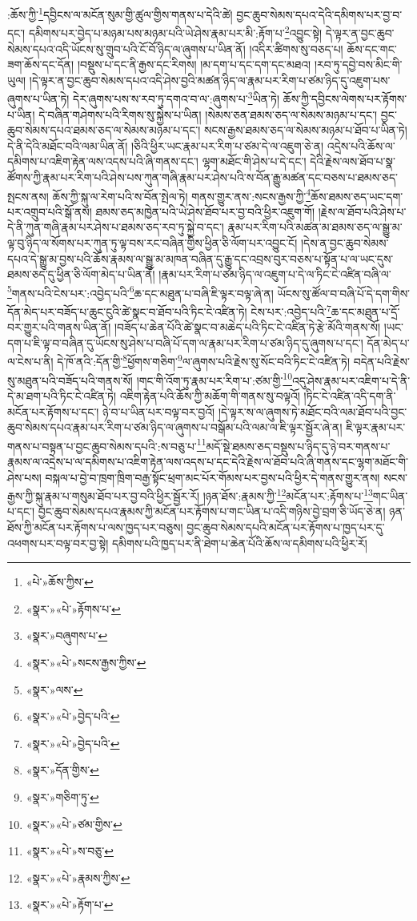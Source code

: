 :ཆོས་ཀྱི་\footnote{«པེ་»ཆོས་ཀྱིས་}དབྱིངས་ལ་མངོན་སུམ་གྱི་ཚུལ་གྱིས་གནས་པ་དེའི་ཚེ། བྱང་ཆུབ་སེམས་དཔའ་དེའི་དམིགས་པར་བྱ་བ་དང་། དམིགས་པར་བྱེད་པ་མཉམ་པས་མཉམ་པའི་ཡེ་ཤེས་རྣམ་པར་མི་:རྟོག་པ་\footnote{«སྣར་»«པེ་»རྟོགས་པ་}འབྱུང་སྟེ། དེ་ལྟར་ན་བྱང་ཆུབ་སེམས་དཔའ་འདི་ཡོངས་སུ་གྲུབ་པའི་ངོ་བོ་ཉིད་ལ་ཞུགས་པ་ཡིན་ནོ། །འདིར་ཚིགས་སུ་བཅད་པ། ཆོས་དང་གང་ཟག་ཆོས་དང་དོན། །བསྡུས་པ་དང་ནི་རྒྱས་དང་རིགས། །མ་དག་པ་དང་དག་དང་མཐའ། །རབ་ཏུ་དབྱེ་བས་མིང་གི་ཡུལ། །དེ་ལྟར་ན་བྱང་ཆུབ་སེམས་དཔའ་འདི་ཤེས་བྱའི་མཚན་ཉིད་ལ་རྣམ་པར་རིག་པ་ཙམ་ཉིད་དུ་འཇུག་པས་ཞུགས་པ་ཡིན་ཏེ། དེར་ཞུགས་པས་ས་རབ་ཏུ་དགའ་བ་ལ་:ཞུགས་པ་\footnote{«སྣར་»བཞུགས་པ་}ཡིན་ཏེ། ཆོས་ཀྱི་དབྱིངས་ལེགས་པར་རྟོགས་པ་ཡིན། དེ་བཞིན་གཤེགས་པའི་རིགས་སུ་སྐྱེས་པ་ཡིན། །སེམས་ཅན་ཐམས་ཅད་ལ་སེམས་མཉམ་པ་དང་། བྱང་ཆུབ་སེམས་དཔའ་ཐམས་ཅད་ལ་སེམས་མཉམ་པ་དང་། སངས་རྒྱས་ཐམས་ཅད་ལ་སེམས་མཉམ་པ་ཐོབ་པ་ཡིན་ཏེ། དེ་ནི་དེའི་མཐོང་བའི་ལམ་ཡིན་ནོ། །ཅིའི་ཕྱིར་ཡང་རྣམ་པར་རིག་པ་ཙམ་དེ་ལ་འཇུག་ཅེ་ན། འདྲེས་པའི་ཆོས་ལ་དམིགས་པ་འཇིག་རྟེན་ལས་འདས་པའི་ཞི་གནས་དང་། ལྷག་མཐོང་གི་ཤེས་པ་དེ་དང་། དེའི་རྗེས་ལས་ཐོབ་པ་སྣ་ཚོགས་ཀྱི་རྣམ་པར་རིག་པའི་ཤེས་པས་ཀུན་གཞི་རྣམ་པར་ཤེས་པའི་ས་བོན་རྒྱུ་མཚན་དང་བཅས་པ་ཐམས་ཅད་སྤངས་ནས། ཆོས་ཀྱི་སྐུ་ལ་རེག་པའི་ས་བོན་སྤེལ་ཏེ། གནས་གྱུར་ནས་:སངས་རྒྱས་ཀྱི་\footnote{«སྣར་»«པེ་»སངས་རྒྱས་ཀྱིས་}ཆོས་ཐམས་ཅད་ཡང་དག་པར་འགྲུབ་པའི་སྒོ་ནས། ཐམས་ཅད་མཁྱེན་པའི་ཡེ་ཤེས་ཐོབ་པར་བྱ་བའི་ཕྱིར་འཇུག་གོ། །རྗེས་ལ་ཐོབ་པའི་ཤེས་པ་དེ་ནི་ཀུན་གཞི་རྣམ་པར་ཤེས་པ་ཐམས་ཅད་རབ་ཏུ་སྐྱེ་བ་དང་། རྣམ་པར་རིག་པའི་མཚན་མ་ཐམས་ཅད་ལ་སྒྱུ་མ་ལྟ་བུ་ཉིད་ལ་སོགས་པར་ཀུན་ཏུ་ལྟ་བས་རང་བཞིན་གྱིས་ཕྱིན་ཅི་ལོག་པར་འབྱུང་ངོ། །དེས་ན་བྱང་ཆུབ་སེམས་དཔའ་དེ་སྒྱུ་མ་བྱས་པའི་ཆོས་རྣམས་ལ་སྒྱུ་མ་མཁན་བཞིན་དུ་རྒྱུ་དང་འབྲས་བུར་བཅས་པ་སྟོན་པ་ལ་ཡང་དུས་ཐམས་ཅད་དུ་ཕྱིན་ཅི་ལོག་མེད་པ་ཡིན་ནོ། །རྣམ་པར་རིག་པ་ཙམ་ཉིད་ལ་འཇུག་པ་དེ་ལ་ཏིང་ངེ་འཛིན་བཞི་ལ་\footnote{«སྣར་»ལས་}གནས་པའི་ངེས་པར་:འབྱེད་པའི་\footnote{«སྣར་»«པེ་»བྱེད་པའི་}ཆ་དང་མཐུན་པ་བཞི་ཇི་ལྟར་བལྟ་ཞེ་ན། ཡོངས་སུ་ཚོལ་བ་བཞི་པོ་དེ་དག་གིས་དོན་མེད་པར་བཟོད་པ་ཆུང་ངུའི་ཚེ་སྣང་བ་ཐོབ་པའི་ཏིང་ངེ་འཛིན་ཏེ། ངེས་པར་:འབྱེད་པའི་\footnote{«སྣར་»«པེ་»བྱེད་པའི་}ཆ་དང་མཐུན་པ་དྲོ་བར་གྱུར་པའི་གནས་ཡིན་ནོ། །བཟོད་པ་ཆེན་པོའི་ཚེ་སྣང་བ་མཆེད་པའི་ཏིང་ངེ་འཛིན་ཏེ་རྩེ་མོའི་གནས་སོ། །ཡང་དག་པ་ཇི་ལྟ་བ་བཞིན་དུ་ཡོངས་སུ་ཤེས་པ་བཞི་པོ་དག་ལ་རྣམ་པར་རིག་པ་ཙམ་ཉིད་དུ་ཞུགས་པ་དང་། དོན་མེད་པ་ལ་ངེས་པ་ནི། དེ་ཁོ་ནའི་:དོན་གྱི་\footnote{«སྣར་»དོན་གྱིས་}ཕྱོགས་གཅིག་\footnote{«སྣར་»གཅིག་ཏུ་}ལ་ཞུགས་པའི་རྗེས་སུ་སོང་བའི་ཏིང་ངེ་འཛིན་ཏེ། བདེན་པའི་རྗེས་སུ་མཐུན་པའི་བཟོད་པའི་གནས་སོ། །གང་གི་འོག་ཏུ་རྣམ་པར་རིག་པ་:ཙམ་གྱི་\footnote{«སྣར་»«པེ་»ཙམ་གྱིས་}འདུ་ཤེས་རྣམ་པར་འཇིག་པ་དེ་ནི་དེ་མ་ཐག་པའི་ཏིང་ངེ་འཛིན་ཏེ། འཇིག་རྟེན་པའི་ཆོས་ཀྱི་མཆོག་གི་གནས་སུ་བལྟའོ། །ཏིང་ངེ་འཛིན་འདི་དག་ནི་མངོན་པར་རྟོགས་པ་དང་། ཉེ་བ་པ་ཡིན་པར་བལྟ་བར་བྱའོ། །དེ་ལྟར་ས་ལ་ཞུགས་ཏེ་མཐོང་བའི་ལམ་ཐོབ་པའི་བྱང་ཆུབ་སེམས་དཔའ་རྣམ་པར་རིག་པ་ཙམ་ཉིད་ལ་ཞུགས་པ་བསྒོམ་པའི་ལམ་ལ་ཇི་ལྟར་སྦྱོར་ཞེ་ན། ཇི་ལྟར་རྣམ་པར་གནས་པ་བསྟན་པ་བྱང་ཆུབ་སེམས་དཔའི་:ས་བཅུ་པ་\footnote{«སྣར་»«པེ་»ས་བཅུ་}མདོ་སྡེ་ཐམས་ཅད་བསྡུས་པ་ཉིད་དུ་ཉེ་བར་གནས་པ་རྣམས་ལ་འདྲེས་པ་ལ་དམིགས་པ་འཇིག་རྟེན་ལས་འདས་པ་དང་དེའི་རྗེས་ལ་ཐོབ་པའི་ཞི་གནས་དང་ལྷག་མཐོང་གི་ཤེས་པས། བསྐལ་པ་བྱེ་བ་ཁྲག་ཁྲིག་བརྒྱ་སྟོང་ཕྲག་མང་པོར་གོམས་པར་བྱས་པའི་ཕྱིར་དེ་གནས་གྱུར་ནས། སངས་རྒྱས་ཀྱི་སྐུ་རྣམ་པ་གསུམ་ཐོབ་པར་བྱ་བའི་ཕྱིར་སྦྱོར་རོ། །ཉན་ཐོས་:རྣམས་ཀྱི་\footnote{«སྣར་»«པེ་»རྣམས་ཀྱིས་}མངོན་པར་:རྟོགས་པ་\footnote{«སྣར་»«པེ་»རྟོག་པ་}གང་ཡིན་པ་དང་། བྱང་ཆུབ་སེམས་དཔའ་རྣམས་ཀྱི་མངོན་པར་རྟོགས་པ་གང་ཡིན་པ་འདི་གཉིས་བྱེ་བྲག་ཅི་ཡོད་ཅེ་ན། ཉན་ཐོས་ཀྱི་མངོན་པར་རྟོགས་པ་ལས་ཁྱད་པར་བཅུས། བྱང་ཆུབ་སེམས་དཔའི་མངོན་པར་རྟོགས་པ་ཁྱད་པར་དུ་འཕགས་པར་བལྟ་བར་བྱ་སྟེ། དམིགས་པའི་ཁྱད་པར་ནི་ཐེག་པ་ཆེན་པོའི་ཆོས་ལ་དམིགས་པའི་ཕྱིར་རོ། 